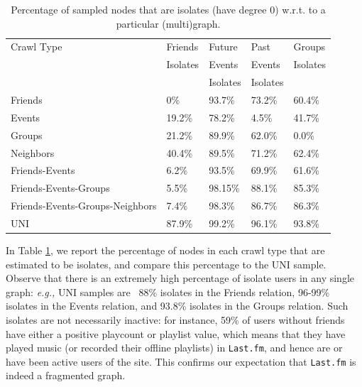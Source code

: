 \documentclass[10pt, conference]{./IEEEtran}
\newcommand{\eg}{{\em e.g., }}
\newcommand{\lastfm}{{\tt Last.fm}\xspace}
\begin{document}
\begin{table}[t!]
\begin{center}
\begin{tabular}{@{}l@{\,}||@{\,}l@{\,}|@{\,}l@{\,}|@{\,}l@{\,}|@{\,}l@{\,}}
Crawl Type                       &  Friends   &  Future       &  Past       & Groups \\
                                 &  Isolates  &   Events      &  Events     & Isolates\\ 
                                 &            &  Isolates     & Isolates     & \\
\hline \hline
Friends                          &   0\%      &   93.7\%      &    73.2\%   & 60.4\%  \\
\hline
Events                           & 19.2\%     &   78.2\%      &    4.5\%    &  41.7\%  \\
\hline
Groups                           & 21.2\%     &   89.9\%      &    62.0\%   & 0.0\% \\
\hline
Neighbors                        & 40.4\%     &   89.5\%      &    71.2\%   & 62.4\% \\
\hline
Friends-Events                   & 6.2\%     &   93.5\%      &    69.9\%    & 61.6\% \\
\hline
Friends-Events-Groups            & 5.5\%      &   98.15\%      &    88.1\%   & 85.3\% \\
\hline
Friends-Events-Groups-Neighbors  & 7.4\%      &   98.3\%      &    86.7\%   & 86.3\% \\
\hline
UNI                              & 87.9\%    &   99.2\%      &   96.1\%    &  93.8\% \\
\end{tabular}
\end{center}
\caption{Percentage of sampled nodes that are isolates (have degree 0) w.r.t. to a particular (multi)graph.}
\label{tab:percentage_isolates}
\end{table}

In Table \ref{tab:percentage_isolates}, we report the percentage of nodes in each crawl type that are estimated to be isolates, and compare this percentage to the UNI sample. Observe that there is an extremely high percentage of isolate users in any single graph: \eg  UNI samples are ~88\% isolates in the Friends relation,  96-99\% isolates in the Events relation, and 93.8\% isolates in the Groups relation. Such isolates are not necessarily inactive: for instance, 59\% of users without friends have either a positive playcount or playlist value, which means that they have played music (or recorded their offline playlists) in \lastfm, and hence are or have been active users of the site. This confirms our expectation that \lastfm is indeed a fragmented graph.
\end{document}
